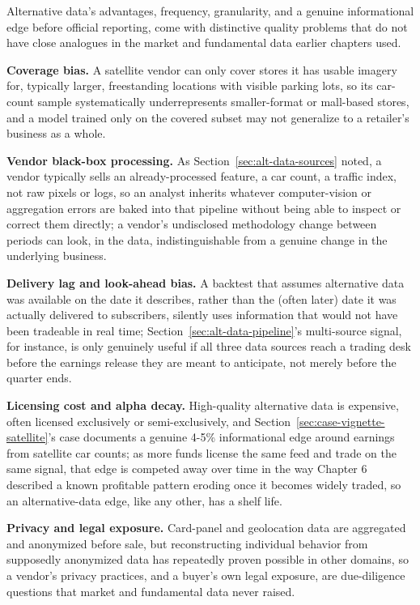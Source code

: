 \documentclass[../ai_in_finance]{subfiles}
\begin{document}
Alternative data's advantages, frequency, granularity, and a genuine informational edge before official reporting, come with distinctive quality problems that do not have close analogues in the market and fundamental data earlier chapters used.

\textbf{Coverage bias.} A satellite vendor can only cover stores it has usable imagery for, typically larger, freestanding locations with visible parking lots, so its car-count sample systematically underrepresents smaller-format or mall-based stores, and a model trained only on the covered subset may not generalize to a retailer's business as a whole.

\textbf{Vendor black-box processing.} As Section~\ref{sec:alt-data-sources} noted, a vendor typically sells an already-processed feature, a car count, a traffic index, not raw pixels or logs, so an analyst inherits whatever computer-vision or aggregation errors are baked into that pipeline without being able to inspect or correct them directly; a vendor's undisclosed methodology change between periods can look, in the data, indistinguishable from a genuine change in the underlying business.

\textbf{Delivery lag and look-ahead bias.} A backtest that assumes alternative data was available on the date it describes, rather than the (often later) date it was actually delivered to subscribers, silently uses information that would not have been tradeable in real time; Section~\ref{sec:alt-data-pipeline}'s multi-source signal, for instance, is only genuinely useful if all three data sources reach a trading desk before the earnings release they are meant to anticipate, not merely before the quarter ends.

\textbf{Licensing cost and alpha decay.} High-quality alternative data is expensive, often licensed exclusively or semi-exclusively, and Section~\ref{sec:case-vignette-satellite}'s case documents a genuine 4-5\% informational edge around earnings from satellite car counts; as more funds license the same feed and trade on the same signal, that edge is competed away over time in the way Chapter 6 described a known profitable pattern eroding once it becomes widely traded, so an alternative-data edge, like any other, has a shelf life.

\textbf{Privacy and legal exposure.} Card-panel and geolocation data are aggregated and anonymized before sale, but reconstructing individual behavior from supposedly anonymized data has repeatedly proven possible in other domains, so a vendor's privacy practices, and a buyer's own legal exposure, are due-diligence questions that market and fundamental data never raised.
\end{document}
